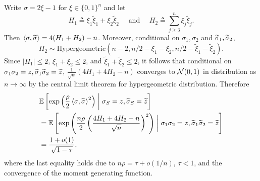 Write $\sigma=2\xi-1$ for $\xi\in\{0,1\}^n$ and let 
$$
H_1\triangleq \xi_1 \tilde{\xi}_1 + \xi_2 \tilde{\xi}_2 
\quad \text{ and } \quad 
H_2 \triangleq \sum_{j \ge 3}^n \xi_j \tilde{\xi}_j.
$$ 
Then $\left \langle \sigma, \widetilde{\sigma} \right\rangle = 4 (H_1+H_2) -n$.
Moreover, conditional  on $\sigma_1, \sigma_2$ and $\widetilde{\sigma}_1, \widetilde{\sigma}_2$, 
$$
H_2 \sim \text{Hypergeometric} \left( n-2, n/2 - \xi_1-\xi_2, n/2 - \tilde{\xi}_1-\tilde{\xi}_2 \right).
$$
Since $|H_1| \le 2$, $\xi_1+\xi_2 \le 2 $, and $\tilde{\xi}_1+\tilde{\xi}_2 \le 2$, 
it follows that 
conditional on $\sigma_1 \sigma_2=z, \widetilde{\sigma}_1 \widetilde{\sigma}_2 ={\widetilde{z}} $,
$ \frac{1}{\sqrt{n}} ( 4H_1 + 4H_2 - n )$ converges to ${\mathcal{N}}(0,1)$ in distribution 
as $n \to \infty$ by the central limit theorem for hypergeometric distribution. 
Therefore
\begin{align*}
& \mathbb{E} \left[  \exp \left(  \frac{\rho}{2} \left \langle  \sigma, \widetilde{\sigma} \right\rangle^2  \right) \mathrel{\bigg|} \sigma_S=z, \widetilde{\sigma}_S ={\widetilde{z}} \right] \\
& =\mathbb{E}\left[  \exp \left(  \frac{n\rho}{2} \left( \frac{ 4 H_1 + 4H_2 - n}{\sqrt{n} } \right)^2 \right) \mathrel{\bigg|} 
\sigma_1 \sigma_2=z, \widetilde{\sigma}_1 \widetilde{\sigma}_2 ={\widetilde{z}}  \right]  \\
& = \frac{1+o(1)}{\sqrt{1-\tau} },
\end{align*}
where the last equality holds due to $n \rho = \tau +o(1/n)$, $\tau<1$, 
and the convergence of the moment generating function. 

